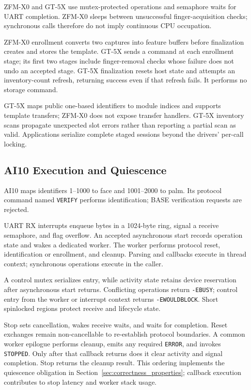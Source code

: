 ZFM-X0 and GT-5X use mutex-protected operations and semaphore waits for UART completion. ZFM-X0 sleeps between unsuccessful finger-acquisition checks; synchronous calls therefore do not imply continuous CPU occupation.

ZFM-X0 enrollment converts two captures into feature buffers before finalization creates and stores the template. GT-5X sends a command at each enrollment stage; its first two stages include finger-removal checks whose failure does not undo an accepted stage. GT-5X finalization resets host state and attempts an inventory-count refresh, returning success even if that refresh fails. It performs no storage command.

GT-5X maps public one-based identifiers to module indices and supports template transfers; ZFM-X0 does not expose transfer handlers. GT-5X inventory scans propagate unexpected slot errors rather than reporting a partial scan as valid. Applications serialize complete staged sessions beyond the drivers' per-call locking.

\subsection{AI10 Execution and Quiescence}

AI10 maps identifiers 1--1000 to face and 1001--2000 to palm. Its protocol command named \texttt{VERIFY} performs identification; BASE verification requests are rejected.

UART RX interrupts enqueue bytes in a 1024-byte ring, signal a receive semaphore, and flag overflow. An accepted asynchronous start records operation state and wakes a dedicated worker. The worker performs protocol reset, identification or enrollment, and cleanup. Parsing and callbacks execute in thread context; synchronous operations execute in the caller.

A control mutex serializes entry, while activity state retains device reservation after asynchronous start returns. Conflicting operations return \texttt{-EBUSY}; control entry from the worker or interrupt context returns \texttt{-EWOULDBLOCK}. Short spinlocked regions protect receive and lifecycle state.

Stop sets cancellation, wakes receive waits, and waits for completion. Reset exchanges remain non-cancellable to re-establish protocol boundaries. A common worker epilogue performs cleanup, emits any required \texttt{ERROR}, and invokes \texttt{STOPPED}. Only after that callback returns does it clear activity and signal completion. Stop returns the cleanup result. This ordering implements the quiescence obligation in Section~\ref{sec:correctness_properties}; callback execution contributes to stop latency and worker stack usage.

